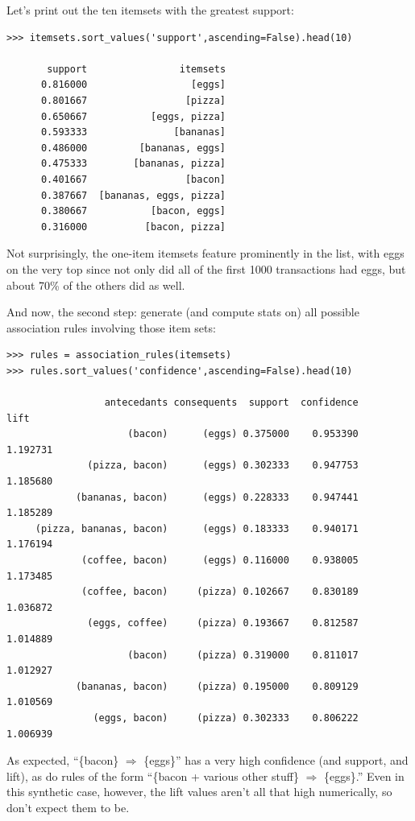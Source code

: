 \vspace{.1in}
Let's print out the ten itemsets with the greatest support:
\begin{Verbatim}[fontsize=\footnotesize,samepage=true,frame=single]
>>> itemsets.sort_values('support',ascending=False).head(10)

       support                itemsets
      0.816000                  [eggs]
      0.801667                 [pizza]
      0.650667           [eggs, pizza]
      0.593333               [bananas]
      0.486000         [bananas, eggs]
      0.475333        [bananas, pizza]
      0.401667                 [bacon]
      0.387667  [bananas, eggs, pizza]
      0.380667           [bacon, eggs]
      0.316000          [bacon, pizza]
\end{Verbatim}

Not surprisingly, the one-item itemsets feature prominently in the list, with
eggs on the very top since not only did all of the first 1000 transactions had
eggs, but about 70\% of the others did as well.

And now, the second step: generate (and compute stats on) all possible
association rules involving those item sets:

\begin{Verbatim}[fontsize=\footnotesize,samepage=true,frame=single]
>>> rules = association_rules(itemsets)
>>> rules.sort_values('confidence',ascending=False).head(10)

                 antecedants consequents  support  confidence      lift 
                     (bacon)      (eggs) 0.375000    0.953390  1.192731 
              (pizza, bacon)      (eggs) 0.302333    0.947753  1.185680 
            (bananas, bacon)      (eggs) 0.228333    0.947441  1.185289 
     (pizza, bananas, bacon)      (eggs) 0.183333    0.940171  1.176194 
             (coffee, bacon)      (eggs) 0.116000    0.938005  1.173485 
             (coffee, bacon)     (pizza) 0.102667    0.830189  1.036872 
              (eggs, coffee)     (pizza) 0.193667    0.812587  1.014889 
                     (bacon)     (pizza) 0.319000    0.811017  1.012927 
            (bananas, bacon)     (pizza) 0.195000    0.809129  1.010569 
               (eggs, bacon)     (pizza) 0.302333    0.806222  1.006939 
\end{Verbatim}

As expected, ``\{bacon\} $\Rightarrow$ \{eggs\}'' has a very high confidence
(and support, and lift), as do rules of the form ``\{bacon + various other
stuff\} $\Rightarrow$ \{eggs\}.'' Even in this synthetic case, however, the
lift values aren't all that high numerically, so don't expect them to be.




